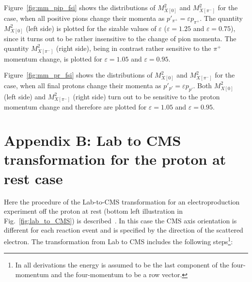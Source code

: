 Figure~\ref{fig:mm_pip_fsi} shows the distributions of $M_{X[0]}^{2}$ and $M_{X[\pi^{-}]}^{2}$ for the case, when all positive pions change their momenta as $p'_{\pi^{+}} = \varepsilon p_{\pi^{+}}$. The quantity $M_{X[0]}^{2}$ (left side) is plotted for the sizable values of $\varepsilon$ ($\varepsilon = 1.25$ and $\varepsilon = 0.75$), since it turns out to be rather insensitive to the change of pion momenta. The quantity 
$M_{X[\pi^{-}]}^{2}$ (right side), being in contrast rather sensitive to the $\pi^{+}$ momentum change, is plotted for $\varepsilon = 1.05$ and $\varepsilon = 0.95$.

Figure~\ref{fig:mm_pr_fsi} shows the distributions of $M_{X[0]}^{2}$ and $M_{X[\pi^{-}]}^{2}$ for the case, when all final protons change their momenta as $p'_{p'} = \varepsilon p_{p'}$. Both $M_{X[0]}^{2}$ (left side) and $M_{X[\pi^{-}]}^{2}$ (right side) turn out to be sensitive to the proton momentum change and therefore are plotted for $\varepsilon = 1.05$ and $\varepsilon = 0.95$.

\renewcommand{\thesection}{B}
    \makeatletter
   \renewcommand{\theequation}{\thesection.\@arabic\c@equation}
    \makeatother
\section*{Appendix B: Lab to CMS transformation for the proton at rest case}
\label{app_lab_cms_trans}

Here the procedure of the Lab-to-CMS transformation for an electroproduction experiment off the proton at rest (bottom left illustration in Fig.~\ref{fig:lab_to_CMS}) is described~\cite{Fed_an_note:2017}. In this case the CMS axis orientation is different for each reaction event and is specified by the direction of the scattered electron. The transformation from Lab to CMS includes the following steps\footnote[1]{In all derivations the energy is assumed to be the last component of the four-momentum and the four-momentum to be a row vector.}:\vspace{-1em}

